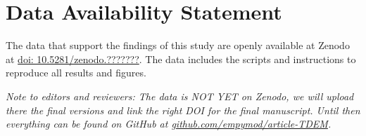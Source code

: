 \documentclass[
    manuscript,
  ]{geophysics}
\begin{document}
\section{Data Availability Statement}

The data that support the findings of this study are openly available at Zenodo
at \href{https://zenodo.org/badge/DOI/10.5281/zenodo.???????}{doi:
10.5281/zenodo.???????}. The data includes the scripts and instructions to
reproduce all results and figures.

\emph{Note to editors and reviewers: The data is NOT YET on Zenodo, we will
  upload there the final versions and link the right DOI for the final
  manuscript. Until then everything can be found on GitHub at
  \href{https://github.com/empymod/article-TDEM}%
  {github.com/empymod/article-TDEM}.}



\end{document}
